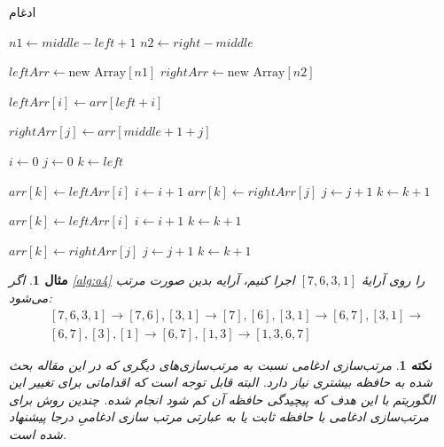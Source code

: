 \documentclass[12pt]{article}
\newtheorem{remark}{نکته}
\newtheorem{example}{مثال}
\begin{document}
\begin{algorithm}[H]
  \caption{ادغام}
  \label{alg:a5}
  \begin{latin}
    \begin{algorithmic}[1]
      \State $n1 \gets middle - left + 1$
      \State $n2 \gets right - middle$

      \State $leftArr \gets \text{new Array}[n1]$
      \State $rightArr \gets \text{new Array}[n2]$

      \State $leftArr[i] \gets arr[left + i]$
      \EndFor

      \State $rightArr[j] \gets arr[middle + 1 + j]$
      \EndFor

      \State $i \gets 0$
      \State $j \gets 0$
      \State $k \gets left$

      \State $arr[k] \gets leftArr[i]$
      \State $i \gets i + 1$
      \Else
      \State $arr[k] \gets rightArr[j]$
      \State $j \gets j + 1$
      \EndIf
      \State $k \gets k + 1$
      \EndWhile

      \State $arr[k] \gets leftArr[i]$
      \State $i \gets i + 1$
      \State $k \gets k + 1$
      \EndWhile

      \State $arr[k] \gets rightArr[j]$
      \State $j \gets j + 1$
      \State $k \gets k + 1$
      \EndWhile
      \EndProcedure
    \end{algorithmic}
  \end{latin}
\end{algorithm}

\begin{example}
  اگر
  \cref{alg:a4}
  را روی آرایهٔ
  $[7, 6, 3, 1]$
  اجرا کنیم،
  آرایه بدین صورت مرتب می‌شود:
  \begin{align*}
     & [7, 6, 3, 1] \rightarrow [7, 6], [3, 1] \rightarrow
    [7], [6], [3, 1] \rightarrow [6, 7], [3, 1] \rightarrow    \\
     & [6, 7], [3], [1] \rightarrow [6, 7], [1, 3] \rightarrow
    [1, 3, 6, 7]
  \end{align*}
\end{example}

\begin{remark}
  مرتب‌سازی ادغامی نسبت به مرتب‌سازی‌های دیگری که در این مقاله بحث شده
  به حافظه بیشتری نیاز دارد. البته قابل توجه است که اقداماتی برای تغییر این الگوریتم
  با این هدف که پیچیدگی حافظه آن کم شود انجام شده.
  چندین روش برای مرتب‌سازی ادغامی با حافظه ثابت
  یا به عبارتی مرتب سازی ادغامیِ درجا
  پیشنهاد شده است.
  \cite{merge1}
\end{remark}

{
\fontsize{12pt}{10pt}\selectfont


}
\end{document}
